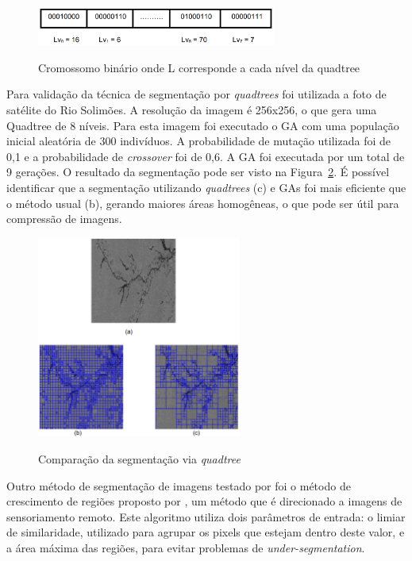 \documentclass[12pt,oneside,a4paper,english,french,spanish,brazil,]{abntex2}
\begin{document}
\begin{figure}[ht]
\centering
\caption{Cromossomo binário onde L corresponde a cada nível da quadtree}
\includegraphics[width=0.7\textwidth]{imagens/TrCo_Matias_Cromossomo_1.PNG}
\label{fig:TrCo_Matias_Cromossomo_1}
\end{figure}

Para validação da técnica de segmentação por \textit{quadtrees} foi utilizada a foto de satélite do Rio Solimões. A resolução da imagem é 256x256, o que gera uma Quadtree de 8 níveis. Para esta imagem foi executado o GA com uma população inicial aleatória de 300 indivíduos. A probabilidade de mutação utilizada foi de 0,1 e a probabilidade de \textit{crossover} foi de 0,6. A GA foi executada por um total de 9 gerações. O resultado da segmentação pode ser visto na Figura~\ref{fig:TrCo_Matias_Quadtree_1}. É possível identificar que a segmentação utilizando \textit{quadtrees} (c) e GAs foi mais eficiente que o método usual (b), gerando maiores áreas homogêneas, o que pode ser útil para compressão de imagens.

\begin{figure}[ht]
\centering
\caption{Comparação da segmentação via \textit{quadtree}}
\includegraphics[width=0.6\textwidth]{imagens/TrCo_Matias_Quadtree_1.PNG}
\label{fig:TrCo_Matias_Quadtree_1}
\end{figure}

Outro método de segmentação de imagens testado por \citet{matias:2007} foi o método de crescimento de regiões proposto por \citet{bins:1996}, um método que é direcionado a imagens de sensoriamento remoto. Este algoritmo utiliza dois parâmetros de entrada: o limiar de similaridade, utilizado para agrupar os pixels que estejam dentro deste valor, e a área máxima das regiões, para evitar problemas de \textit{under-segmentation}.
\end{document}

